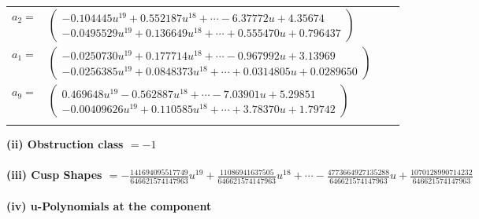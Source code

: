 \documentclass[1p]{elsarticle_modified}
\theoremstyle{definition}
\begin{document}
\begin{tabular}{m{7pt} m{180pt} m{7pt} m{180pt} }
\flushright $a_{2}=$&$\begin{pmatrix}-0.104445 u^{19}+0.552187 u^{18}+\cdots-6.37772 u+4.35674\\-0.0495529 u^{19}+0.136649 u^{18}+\cdots+0.555470 u+0.796437\end{pmatrix}$ \\
\flushright $a_{1}=$&$\begin{pmatrix}-0.0250730 u^{19}+0.177714 u^{18}+\cdots-0.967992 u+3.13969\\-0.0256385 u^{19}+0.0848373 u^{18}+\cdots+0.0314805 u+0.0289650\end{pmatrix}$ \\
\flushright $a_{9}=$&$\begin{pmatrix}0.469648 u^{19}-0.562887 u^{18}+\cdots-7.03901 u+5.29851\\-0.00409626 u^{19}+0.110585 u^{18}+\cdots+3.78370 u+1.79742\end{pmatrix}$\\&\end{tabular}
\flushleft \textbf{(ii) Obstruction class $= -1$}\\~\\
\flushleft \textbf{(iii) Cusp Shapes $= -\frac{141694095517749}{646621574147963} u^{19}+\frac{11086941637505}{646621574147963} u^{18}+\cdots-\frac{4773664927135288}{646621574147963} u+\frac{1070128990714232}{646621574147963}$}\\~\\
\newpage\renewcommand{\arraystretch}{1}
\flushleft \textbf{(iv) u-Polynomials at the component}\newline \\
\end{document}

